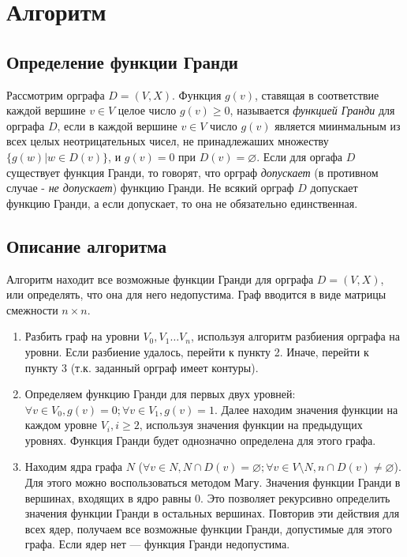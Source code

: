 \documentclass[12pt, letterpaper, titlepage]{article}
\let\emptyset\varnothing
\begin{document}
\section{Алгоритм}
\subsection{Определение функции Гранди}
Рассмотрим орграфа $D = (V, X)$. Функция $g(v)$, ставящая в соответствие каждой
вершине $v \in V$ целое число $g(v) \geq 0$, называется \emph{функцией Гранди} для
орграфа $D$, если в каждой вершине $v \in V$ число $g(v)$ является миинмальным из всех
целых неотрицательных чисел, не принадлежаших множеству $\{g(w) | w \in D(v)\}$, и
$g(v)=0$ при $D(v)=\emptyset$.
Если для оргафа $D$ существует функция Гранди, то говорят, что орграф \emph{допускает}
(в противном случае - \emph{не допускает}) функцию Гранди.
Не всякий орграф $D$ допускает функцию Гранди, а если допускает, то она не обязательно единственная.
\subsection{Описание алгоритма}
Алгоритм находит все возможные функции Гранди для орграфа $D=(V,X)$, или определять, что она для него недопустима.
Граф вводится в виде матрицы смежности $n \times n$.

\begin{enumerate}
    \item Разбить граф на уровни $V_0, V_1\dots V_n$, используя алгоритм разбиения орграфа на уровни.
    Если разбиение удалось, перейти к пункту 2. Иначе, перейти к пункту 3 (т.к. заданный орграф имеет контуры).
    \item Определяем функцию Гранди для первых двух уровней: $\forall v \in V_0, g(v)=0; \forall v \in V_1, g(v)=1$.
    Далее находим значения функции на каждом уровне $V_i, i\geq 2$, используя значения функции на предыдущих уровнях.
    Функция Гранди будет однозначно определена для этого графа.
    \item Находим ядра графа $N$ ($\forall v \in N,N\cap D(v)=\emptyset;\forall v \in V \setminus N, n\cap D(v) \neq \emptyset$). Для этого можно воспользоваться методом Магу. 
    Значения функции Гранди в вершинах, входящих в ядро равны 0. Это позволяет рекурсивно определить значения
    функции Гранди в остальных вершинах. Повторив эти действия для всех ядер, получаем все возможные функции Гранди, допустимые для этого графа.
    Если ядер нет --- функция Гранди недопустима.
\end{enumerate}
\end{document}
